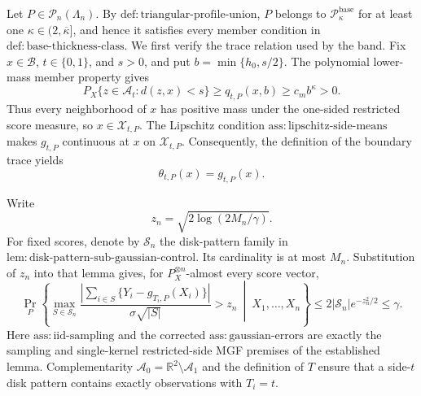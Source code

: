 Let \(P\in\mathcal P_n(\Lambda_n)\). By \(\mathrm{def:triangular\text{-}profile\text{-}union}\), \(P\) belongs to \(\mathcal P_{\kappa}^{\mathrm{base}}\) for at least one \(\kappa\in(2,\overline\kappa]\), and hence it satisfies every member condition in \(\mathrm{def:base\text{-}thickness\text{-}class}\). We first verify the trace relation used by the band. Fix \(x\in\mathcal B\), \(t\in\{0,1\}\), and \(s>0\), and put \(b=\min\{h_0,s/2\}\). The polynomial lower-mass member property gives
\[
 P_X\{z\in\mathcal A_t:d(z,x)<s\}
 \ge q_{t,P}(x,b)\ge c_m b^\kappa>0. \tag{95}
\]
Thus every neighborhood of \(x\) has positive mass under the one-sided restricted score measure, so \(x\in\mathcal X_{t,P}\). The Lipschitz condition \(\mathrm{ass:lipschitz\text{-}side\text{-}means}\) makes \(g_{t,P}\) continuous at \(x\) on \(\mathcal X_{t,P}\). Consequently, the definition of the boundary trace yields
\[
 \theta_{t,P}(x)=g_{t,P}(x). \tag{96}
\]

Write
\[
 z_n=\sqrt{2\log(2M_n/\gamma)}.
\]
For fixed scores, denote by \(\mathscr S_n\) the disk-pattern family in \(\mathrm{lem:disk\text{-}pattern\text{-}sub\text{-}gaussian\text{-}control}\). Its cardinality is at most \(M_n\). Substitution of \(z_n\) into that lemma gives, for \(P_X^{\otimes n}\)-almost every score vector,
\[
 \Pr_P\!\left\{\max_{S\in\mathscr S_n}
 \frac{\left|\sum_{i\in S}\{Y_i-g_{T_i,P}(X_i)\}\right|}
 {\sigma\sqrt{|S|}}>z_n
 \ \middle|\ X_1,\ldots,X_n\right\}
 \le 2|\mathscr S_n|e^{-z_n^2/2}\le\gamma. \tag{97}
\]
Here \(\mathrm{ass:iid\text{-}sampling}\) and the corrected \(\mathrm{ass:gaussian\text{-}errors}\) are exactly the sampling and single-kernel restricted-side MGF premises of the established lemma. Complementarity \(\mathcal A_0=\mathbb R^2\setminus\mathcal A_1\) and the definition of \(T\) ensure that a side-\(t\) disk pattern contains exactly observations with \(T_i=t\).

